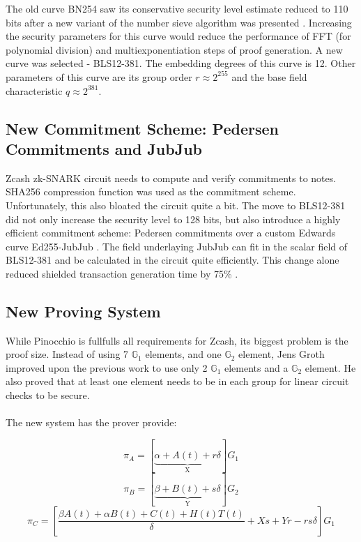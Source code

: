 The old curve BN254 saw its conservative security level estimate reduced to 110 bits after a new variant of the number sieve algorithm was presented \cite{zcashbls12381, cryptoeprint:2015:1027}. Increasing the security parameters for this curve would reduce the performance of FFT (for polynomial division) and multiexponentiation steps of proof generation. A new curve was selected - BLS12-381. The embedding degrees of this curve is 12. Other parameters of this curve are its group order $r \approx 2^{255}$ and the base field characteristic $q \approx 2^{381}$.

\subsection{New Commitment Scheme: Pedersen Commitments and JubJub}

Zcash zk-SNARK circuit needs to compute and verify commitments to notes. SHA256 compression function was used as the commitment scheme. Unfortunately, this also bloated the circuit quite a bit. The move to BLS12-381 did not only increase the security level to 128 bits, but also introduce a highly efficient commitment scheme: Pedersen commitments over a custom Edwards curve Ed255-JubJub \cite{zcashjubjub}. The field underlaying JubJub can fit in the scalar field of BLS12-381 and be calculated in the circuit quite efficiently. This change alone reduced shielded transaction generation time by 75\% \cite{zcashreducing}.

\subsection{New Proving System}
\label{grothexpl}

While Pinocchio is fullfulls all requirements for Zcash, its biggest problem is the proof size. Instead of using 7 $\mathbb{G}_1$ elements, and one $\mathbb{G}_2$ element, Jens Groth \cite{groth2016size} improved upon the previous work to use only 2 $\mathbb{G}_1$ elements and a $\mathbb{G}_2$ element. He also proved that at least one element needs to be in each group for linear circuit checks to be secure.\\
\\
The new system has the prover provide:

$$ \pi_A = [\underbrace{\alpha + A(t) + r\delta}_\text{X}]G_1 $$
$$ \pi_B = [\underbrace{\beta + B(t) + s\delta}_\text{Y}]G_2 $$
$$ \pi_C = [\frac{\beta A(t) + \alpha B(t) + C(t) + H(t)T(t)}{\delta} + Xs + Yr - rs\delta]G_1 $$

